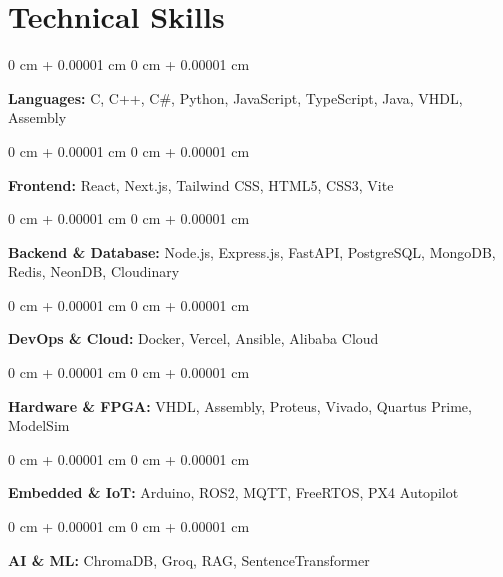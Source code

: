 \documentclass[10pt, letterpaper]{article}
\newenvironment{onecolentry}{
    \begin{adjustwidth}{
        0 cm + 0.00001 cm
    }{
        0 cm + 0.00001 cm
    }
}{
    \end{adjustwidth}
} %
\begin{document}
    
    \section{Technical Skills}



        
        \begin{onecolentry}
            \textbf{Languages:} C, C++, C\#, Python, JavaScript, TypeScript, Java, VHDL, Assembly
        \end{onecolentry}

        \vspace{0.2 cm}

        \begin{onecolentry}
            \textbf{Frontend:} React, Next.js, Tailwind CSS, HTML5, CSS3, Vite
        \end{onecolentry}

        \vspace{0.2 cm}

        \begin{onecolentry}
            \textbf{Backend \& Database:} Node.js, Express.js, FastAPI, PostgreSQL, MongoDB, Redis, NeonDB, Cloudinary
        \end{onecolentry}

        \vspace{0.2 cm}

        \begin{onecolentry}
            \textbf{DevOps \& Cloud:} Docker, Vercel, Ansible, Alibaba Cloud
        \end{onecolentry}

        \vspace{0.2 cm}

        \begin{onecolentry}
            \textbf{Hardware \& FPGA:} VHDL, Assembly, Proteus, Vivado, Quartus Prime, ModelSim
        \end{onecolentry}

        \vspace{0.2 cm}

        \begin{onecolentry}
            \textbf{Embedded \& IoT:} Arduino, ROS2, MQTT, FreeRTOS, PX4 Autopilot
        \end{onecolentry}

        \vspace{0.2 cm}

        \begin{onecolentry}
            \textbf{AI \& ML:} ChromaDB, Groq, RAG, SentenceTransformer
        \end{onecolentry}


    
\end{document}

